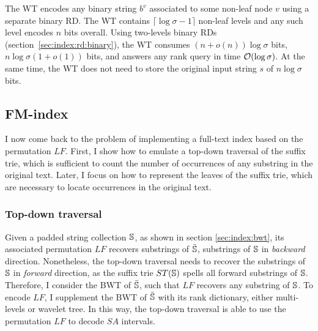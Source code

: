 The WT encodes any binary string $b^v$ associated to some non-leaf node $v$ using a separate binary RD.
The WT contains $\lceil \log \sigma - 1 \rceil$ non-leaf levels and any such level encodes $n$ bits overall.
Using two-levels binary RDs (section~\ref{sec:index:rd:binary}), the WT consumes $(n + o(n)) \log \sigma$ bits, \ie $n \log \sigma (1 + o(1))$ bits, and answers any rank query in time $\mathcal{O}(\log{\sigma})$.
At the same time, the WT does not need to store the original input string $s$ of $n \log \sigma$ bits.

\subsection{FM-index}
\label{sub:fmtrie}

I now come back to the problem of implementing a full-text index based on the permutation $LF$.
First, I show how to emulate a top-down traversal of the suffix trie, which is sufficient to count the number of occurrences of any substring in the original text.
Later, I focus on how to represent the leaves of the suffix trie, which are necessary to locate occurrences in the original text.

\subsubsection{Top-down traversal}

Given a padded string collection $\mathbb{S}$, as shown in section \ref{sec:index:bwt}, its associated permutation $LF$ recovers substrings of $\bar{\mathbb{S}}$, \ie substrings of $\mathbb{S}$ in \emph{backward} direction.
Nonetheless, the top-down traversal needs to recover the substrings of $\mathbb{S}$ in \emph{forward} direction, as the suffix trie $ST(\mathbb{S})$ spells all forward substrings of $\mathbb{S}$.
Therefore, I consider the BWT of $\bar{\mathbb{S}}$, such that $LF$ recovers any substring of $\mathbb{S}$.
To encode $LF$, I supplement the BWT of $\bar{\mathbb{S}}$ with its rank dictionary, either multi-levels or wavelet tree.
In this way, the top-down traversal is able to use the permutation $LF$ to decode $SA$ intervals.

